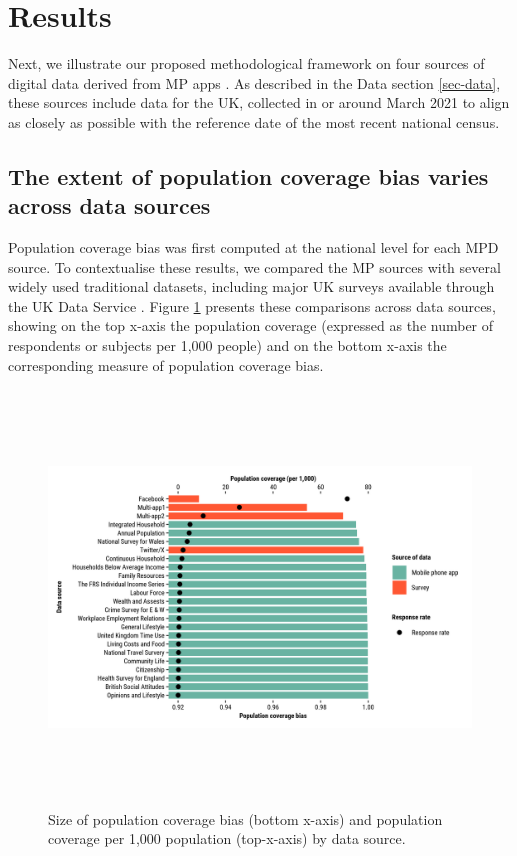 \documentclass[]{rsos}%
\begin{document}
\section{Results}\label{results}

Next, we illustrate our proposed methodological framework on four
sources of digital data derived from MP apps . As
described in the Data section \ref{sec-data}, these sources include
data for the UK, collected in or around March 2021 to align as closely
as possible with the reference date of the most recent national census.

\subsection{The extent of population coverage bias varies across data sources}\label{the-extent-of-population-coverage-bias-varies-across-data-sources}

Population coverage bias was first computed at the national level for
each MPD source. To contextualise these results, we compared the MP
sources with several widely used traditional datasets, including major
UK surveys available through the UK Data Service
\citep{ukdataserviceSurveysData}. Figure \ref{fig:survey} presents these
comparisons across data sources, showing on the top x-axis the
population coverage (expressed as the number of respondents or subjects
per 1,000 people) and on the bottom x-axis the corresponding measure of population coverage bias.

\begin{figure}
\centering
\includegraphics[width=14cm,height=11cm]{figures/compare-surveys-two-axis.png}
\caption{Size of population coverage bias (bottom x-axis) and population coverage per
1,000 population (top-x-axis) by data
source.}\label{fig:survey}
\end{figure}
\end{document}
